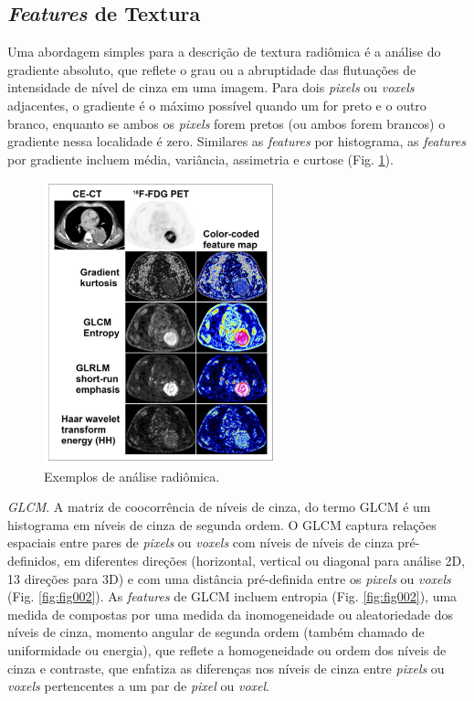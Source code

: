 \subsection{\textit{Features} de Textura}

Uma abordagem simples para a descrição de textura radiômica é a análise do gradiente absoluto, que reflete o grau ou a abruptidade das flutuações de intensidade de nível de cinza em uma imagem. Para dois \textit{pixels} ou \textit{voxels} adjacentes, o gradiente é o máximo possível quando um for preto e o outro branco, enquanto se ambos os \textit{pixels} forem pretos (ou ambos forem brancos) o gradiente nessa localidade é zero. Similares as \textit{features} por histograma, as \textit{features} por gradiente incluem média, variância, assimetria e curtose (Fig. \ref{fig:fig001}).

\captionsetup{justification=centering}
\begin{figure}[htbp]
    \centering
    \includegraphics[width=0.6\textwidth]{figures/fig001.png}
    \caption{Exemplos de análise radiômica.}
    \label{fig:fig001}
\end{figure}

 \textit{GLCM}. A matriz de coocorrência de níveis de cinza, do termo \gls{GLCM} é um histograma em níveis de cinza de segunda ordem. O GLCM captura relações espaciais entre pares de \textit{pixels} ou \textit{voxels} com níveis de níveis de cinza pré-definidos, em diferentes direções (horizontal, vertical ou diagonal para análise 2D, 13 direções para 3D) e com uma distância pré-definida entre os \textit{pixels} ou \textit{voxels} (Fig. \ref{fig:fig002}). As \textit{features} de GLCM incluem entropia (Fig. \ref{fig:fig002}), uma medida de  compostas por uma medida da inomogeneidade ou aleatoriedade dos níveis de cinza, momento angular de segunda ordem (também chamado de uniformidade ou energia), que reflete a homogeneidade ou ordem dos níveis de cinza e contraste, que enfatiza as diferenças nos níveis de cinza entre \textit{pixels} ou \textit{voxels} pertencentes a um par de \textit{pixel} ou \textit{voxel}.

